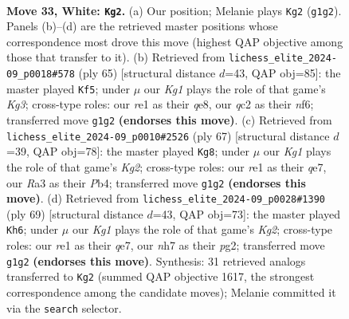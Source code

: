 \documentclass[11pt]{article}
\begin{document}
\clearpage

\begin{figure}[p]\centering
\begin{subfigure}{0.46\textwidth}\centering
\resizebox{\linewidth}{!}{%
\newchessgame
\chessboard[
  setfen={7k/p2p3n/2p2p2/7Q/1PPP4/R7/2q2P1P/4r1K1 w - - 2 33},
  showmover=false,
  pgfstyle=straightmove, color=movearrow, markmove={g1-g2}
]}
\caption{}
\end{subfigure}\hfill
\begin{subfigure}{0.46\textwidth}\centering
\resizebox{\linewidth}{!}{%
\newchessgame
\chessboard[
  setfen={4Q3/pp6/5Nkp/8/3B1P2/1P3P1q/P6P/7K b - - 0 33},
  showmover=false,
  pgfstyle=straightmove, color=movearrow, markmove={g6-f5}
]}
\caption{}
\end{subfigure}
\\[4pt]
\begin{subfigure}{0.46\textwidth}\centering
\resizebox{\linewidth}{!}{%
\newchessgame
\chessboard[
  setfen={8/2p1Q1k1/p6p/7q/Pp1p4/8/1PP3PP/7K b - - 0 34},
  showmover=false,
  pgfstyle=straightmove, color=movearrow, markmove={g7-g8}
]}
\caption{}
\end{subfigure}\hfill
\begin{subfigure}{0.46\textwidth}\centering
\resizebox{\linewidth}{!}{%
\newchessgame
\chessboard[
  setfen={8/4Q1k1/3p2p1/1P2p2p/4P2P/5q2/2r3PK/R7 b - - 0 35},
  showmover=false,
  pgfstyle=straightmove, color=movearrow, markmove={g7-h6}
]}
\caption{}
\end{subfigure}
\caption{\textbf{Move 33, White: \texttt{Kg2}.} (a) Our position; Melanie plays \texttt{Kg2} (\texttt{g1g2}). Panels (b)--(d) are the retrieved master positions whose correspondence most drove this move (highest QAP objective among those that transfer to it). (b) Retrieved from \texttt{lichess\_elite\_2024-09\_p0018\#578} (ply 65) [structural distance $d$=43, QAP obj=85]: the master played \texttt{Kf5}; under $\mu$ our \emph{Kg1} plays the role of that game's \emph{Kg3}; cross-type roles: our \emph{r}e1 as their \emph{q}e8, our \emph{q}c2 as their \emph{n}f6; transferred move \texttt{g1g2} \textbf{(endorses this move)}. (c) Retrieved from \texttt{lichess\_elite\_2024-09\_p0010\#2526} (ply 67) [structural distance $d$=39, QAP obj=78]: the master played \texttt{Kg8}; under $\mu$ our \emph{Kg1} plays the role of that game's \emph{Kg2}; cross-type roles: our \emph{r}e1 as their \emph{q}e7, our \emph{R}a3 as their \emph{P}b4; transferred move \texttt{g1g2} \textbf{(endorses this move)}. (d) Retrieved from \texttt{lichess\_elite\_2024-09\_p0028\#1390} (ply 69) [structural distance $d$=43, QAP obj=73]: the master played \texttt{Kh6}; under $\mu$ our \emph{Kg1} plays the role of that game's \emph{Kg2}; cross-type roles: our \emph{r}e1 as their \emph{q}e7, our \emph{n}h7 as their \emph{p}g2; transferred move \texttt{g1g2} \textbf{(endorses this move)}. Synthesis: 31 retrieved analogs transferred to \texttt{Kg2} (summed QAP objective 1617, the strongest correspondence among the candidate moves); Melanie committed it via the \texttt{search} selector.}
\label{fig:thought-m64}
\end{figure}
\end{document}
